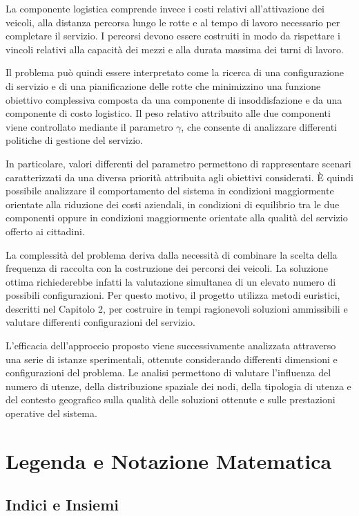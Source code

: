 La componente logistica comprende invece i costi relativi all'attivazione dei veicoli, alla distanza percorsa lungo le rotte e al tempo di lavoro necessario per completare il servizio. I percorsi devono essere costruiti in modo da rispettare i vincoli relativi alla capacità dei mezzi e alla durata massima dei turni di lavoro.

Il problema può quindi essere interpretato come la ricerca di una configurazione di servizio e di una pianificazione delle rotte che minimizzino una funzione obiettivo complessiva composta da una componente di insoddisfazione e da una componente di costo logistico. Il peso relativo attribuito alle due componenti viene controllato mediante il parametro $\gamma$, che consente di analizzare differenti politiche di gestione del servizio.

In particolare, valori differenti del parametro permettono di rappresentare scenari caratterizzati da una diversa priorità attribuita agli obiettivi considerati. È quindi possibile analizzare il comportamento del sistema in condizioni maggiormente orientate alla riduzione dei costi aziendali, in condizioni di equilibrio tra le due componenti oppure in condizioni maggiormente orientate alla qualità del servizio offerto ai cittadini.

La complessità del problema deriva dalla necessità di combinare la scelta della frequenza di raccolta con la costruzione dei percorsi dei veicoli. La soluzione ottima richiederebbe infatti la valutazione simultanea di un elevato numero di possibili configurazioni. Per questo motivo, il progetto utilizza metodi euristici, descritti nel Capitolo 2, per costruire in tempi ragionevoli soluzioni ammissibili e valutare differenti configurazioni del servizio.

L'efficacia dell'approccio proposto viene successivamente analizzata attraverso una serie di istanze sperimentali, ottenute considerando differenti dimensioni e configurazioni del problema. Le analisi permettono di valutare l'influenza del numero di utenze, della distribuzione spaziale dei nodi, della tipologia di utenza e del contesto geografico sulla qualità delle soluzioni ottenute e sulle prestazioni operative del sistema.

\section{Legenda e Notazione Matematica}

\subsection{Indici e Insiemi}

